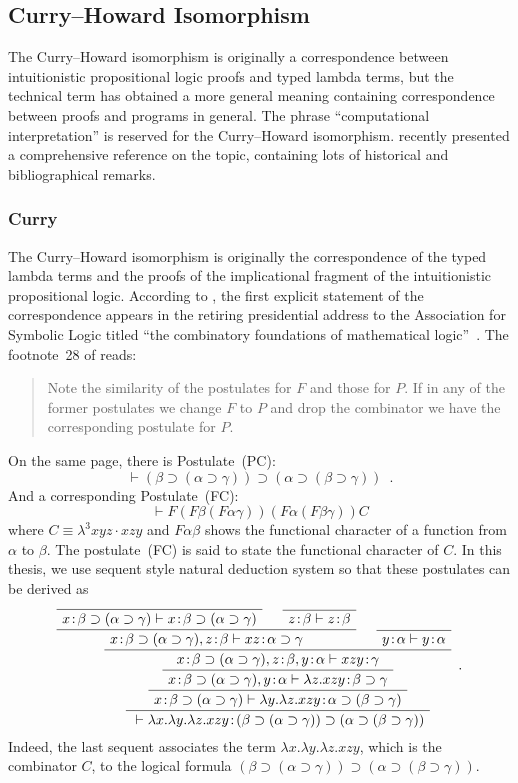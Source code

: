 \subsection{Curry--Howard Isomorphism}

The Curry--Howard isomorphism
 is originally a correspondence between
intuitionistic propositional logic proofs and typed lambda terms, but
the technical term has obtained a more general meaning containing
correspondence between proofs and programs in general.
The phrase ``computational interpretation'' is reserved for
the Curry--Howard isomorphism.
\citet{curryhoward} recently presented a comprehensive reference on the
topic, containing lots of historical and bibliographical remarks.

\subsubsection{Curry}
The Curry--Howard isomorphism is originally the correspondence of
the typed lambda terms and the proofs of the implicational fragment of
the intuitionistic propositional logic.
According to \citep{curryhoward}, the first explicit statement of the
correspondence appears
in the retiring presidential address to the Association for Symbolic
Logic titled ``the combinatory foundations of mathematical
logic''~\cite{curry1942}.
The footnote~28 of \citep{curry1942} reads:
 \begin{quote}
  Note the similarity of the postulates for $F$ and those for $P$.  If
  in any of the former postulates we change $F$ to $P$ and drop the
  combinator we have the corresponding postulate for $P$.
 \end{quote}
 On the same page, there is Postulate~(PC):
\[
 \vdash (\beta\supset (\alpha\supset \gamma))\supset (\alpha \supset
 (\beta\supset \gamma))\enspace.
\]
And a corresponding Postulate~(FC):
\[
 \vdash F(F\beta(F\alpha\gamma))(F\alpha(F\beta\gamma))C
\]
 where $C\equiv \lambda^3 xyz\cdot xzy$ and $F\alpha\beta$ shows the
 functional character of a
 function from $\alpha$ to $\beta$.  The postulate~(FC) is said to
 state the functional character of $C$.
 In this thesis, we use sequent style natural deduction system so that these
 postulates can be derived as
 \[
 \AxiomC{}
 \useq{\tj{x}{\beta\supset (\alpha\supset \gamma)}}{\tj{x}{\beta\supset
 (\alpha\supset \gamma)}}
 \AxiomC{}
 \useq{\tj{z}{\beta}}{\tj{z}{\beta}}
 \bseq{\tj{x}{\beta\supset (\alpha\supset \gamma)},
 \tj{z}{\beta}}{\tj{xz}{\alpha\supset\gamma}}
 \AxiomC{}
 \useq{\tj{y}{\alpha}}{\tj{y}{\alpha}}
 \bseq{\tj{x}{\beta\supset (\alpha\supset \gamma)},
 \tj{z}{\beta},\tj{y}{\alpha}}{\tj{xzy}{\gamma}}
 \useq{\tj{x}{\beta\supset (\alpha\supset
 \gamma)},\tj{y}{\alpha}}{\tj{\lambda z. xzy}{\beta\supset\gamma}}
 \useq{\tj{x}{\beta\supset (\alpha\supset
 \gamma)}}{\tj{\lambda y.\lambda z. xzy}{\alpha\supset(\beta\supset\gamma)}}
 \useq{}{\tj{\lambda x.\lambda y.\lambda z. xzy}{{(\beta\supset (\alpha\supset
 \gamma))}\supset (\alpha\supset(\beta\supset\gamma))}}
 \DisplayProof \enspace .
 \]
 Indeed, the last sequent associates the term $\lambda x.\lambda
 y.\lambda z. xzy$, which is the combinator $C$, to the logical formula
 $(\beta\supset (\alpha\supset
 \gamma))\supset (\alpha\supset(\beta\supset\gamma))$.

